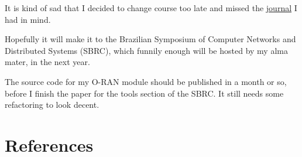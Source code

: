 \documentclass{article}
\begin{document}
    It is kind of sad that I decided to change course too late and missed the
    \href{https://www.comsoc.org/publications/journals/ieee-jsac/cfp/open-ran-new-paradigm-open-virtualized-programmable-and}{journal}
    I had in mind.

    Hopefully it will make it to the Brazilian Symposium of Computer Networks and Distributed Systems (SBRC),
    which funnily enough will be hosted by my alma mater, in the next year.

    The source code for my O-RAN module should be published in a month or so, before I finish the paper for the
    tools section of the SBRC. It still needs some refactoring to look decent.

\section*{References}
\end{document}
